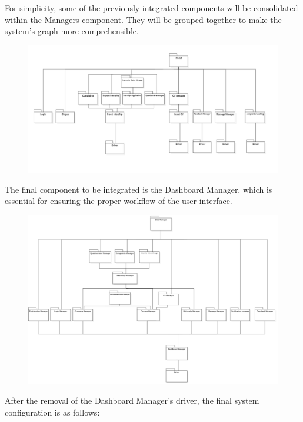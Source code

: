 For simplicity, some of the previously integrated components will be consolidated within the Managers component. They will be grouped together to make the system's graph more comprehensible.

\begin{figure}[H]
    \centering
    \includegraphics[width=1\linewidth]{DD//Images//Implementation Images/firstmanagers.png}
    \label{fig:enter-label}
\end{figure}

The final component to be integrated is the Dashboard Manager, which is essential for ensuring the proper workflow of the user interface.

\begin{figure}[H]
    \centering
    \includegraphics[width=1\linewidth]{DD//Images//Implementation Images/finalmanagers.png}
    \label{fig:enter-label}
\end{figure}

After the removal of the Dashboard Manager's driver, the final system configuration is as follows:

